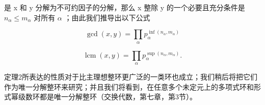 是 x 和 y 分解为不可约因子的分解，那么 x 整除 y 的一个必要且充分条件是 \(n_{\alpha} \leqslant m_{\alpha}\) 对所有 \(\alpha\) ；由此我们推导出以下公式

\[
\operatorname * {g c d} (x, y) = \prod_ {\alpha} p _ {\alpha} ^ {\inf (n _ {\alpha}, m _ {\alpha})}\tag{2}
\]

\[
\operatorname{lcm} (x, y) = \prod_ {\alpha} p _ {\alpha} ^ {\sup \left(n _ {\alpha}, m _ {\alpha}\right)}.\tag{3}
\]

定理2所表达的性质对于比主理想整环更广泛的一类环也成立；我们稍后将把它们作为唯一分解整环来研究；并且我们将看到，在任意多个未定元上的多项式环和形式幂级数环都是唯一分解整环（交换代数，第七章，第3节）。

